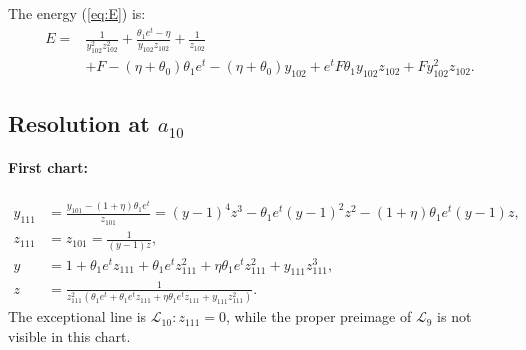 The energy (\ref{eq:E}) is:
$$
\begin{aligned}
E=&
\frac{1}{y_{102}^2 z_{102}^2}
+\frac{\theta_1 e^t-\eta}{y_{102} z_{102}}
+\frac{1}{z_{102}}
\\&
+F
-(\eta+\theta_0) \theta_1 e^t
-(\eta+\theta_0) y_{102}
+e^tF \theta_1 y_{102} z_{102}
+F y_{102}^2 z_{102}
.
\end{aligned}
$$

\subsection{Resolution at $a_{10}$}\label{a10-blow}
\paragraph{First chart:}
$$
\begin{aligned}
y_{111}&=\frac{y_{101}-(1 + \eta)\theta_1  e^t}{z_{101}}
= (y-1)^4z^3 - \theta_1 e^t(y-1)^2z^2  -(1 + \eta)\theta_1  e^t   (y-1)z
,
\\
z_{111}&=z_{101}=\frac1{(y-1)z},
\\
y &= 1 + \theta_1 e^t z_{111} + \theta_1 e^t z_{111}^2 + \eta \theta_1 e^t z_{111}^2 + y_{111} z_{111}^3,
\\
z &= \frac{1}{ z_{111}^2 (\theta_1 e^t + \theta_1 e^t z_{111} + \eta \theta_1 e^t z_{111} + y_{111} z_{111}^2)}.
\end{aligned}
$$
The exceptional line is $\mathcal{L}_{10} : z_{111}=0$, while the proper preimage of $\mathcal{L}_{9}$ is not visible in this chart. 

